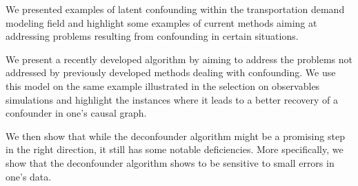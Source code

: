 We presented examples of latent confounding within the transportation demand modeling field and highlight 
some examples of current methods aiming at addressing problems resulting from confounding in certain situations.

We present a recently developed algorithm by \citet{wang_2019_blessings} aiming to address the problems not 
addressed by previously developed methods dealing with confounding. We use this model on the same example illustrated in
the selection on observables simulations and highlight the instances where it leads to a better recovery of 
a confounder in one's causal graph. 

We then show that while the deconfounder algorithm might be a promising step in the right direction, 
it still has some notable deficiencies. More specifically, we show that the deconfounder algorithm shows 
to be sensitive to small errors in one's data.